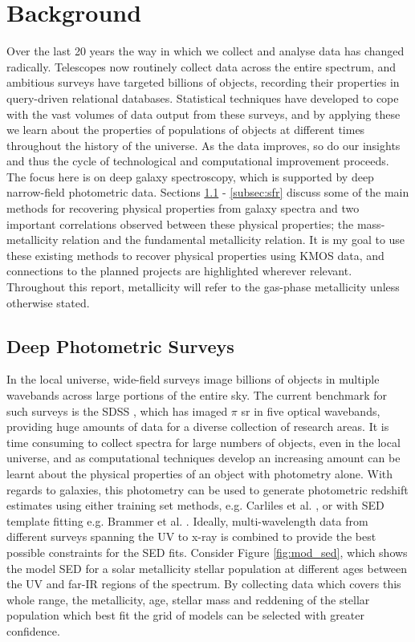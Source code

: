 \documentclass{literature}
\begin{document}
\section{Background}\label{sec:background}
Over the last 20 years the way in which we collect and analyse data has changed radically. Telescopes now routinely collect data across the entire spectrum, and ambitious surveys have targeted billions of objects, recording their properties in query-driven relational databases. Statistical techniques have developed to cope with the vast volumes of data output from these surveys, and by applying these we learn about the properties of populations of objects at different times throughout the history of the universe. As the data improves, so do our insights and thus the cycle of technological and computational improvement proceeds. \\

The focus here is on deep galaxy spectroscopy, which is supported by deep narrow-field photometric data. Sections \ref{subsec:deep_photometry} - \ref{subsec:sfr} discuss some of the main methods for recovering physical properties from galaxy spectra and two important correlations observed between these physical properties; the mass-metallicity relation and the fundamental metallicity relation. It is my goal to use these existing methods to recover physical properties using KMOS data, and connections to the planned projects are highlighted wherever relevant. Throughout this report, metallicity will refer to the gas-phase metallicity unless otherwise stated.  


\subsection{Deep Photometric Surveys}\label{subsec:deep_photometry}
In the local universe, wide-field surveys image billions of objects in multiple wavebands across large portions of the entire sky. The current benchmark for such surveys is the SDSS \citep{York2000}, which has imaged $\pi$ sr in five optical wavebands, providing huge amounts of data for a diverse collection of research areas. It is time consuming to collect spectra for large numbers of objects, even in the local universe, and as computational techniques develop an increasing amount can be learnt about the physical properties of an object with photometry alone. With regards to galaxies, this photometry can be used to generate photometric redshift estimates using either training set methods, e.g. Carliles et al. \citep{Carliles2010}, or with SED template fitting e.g. Brammer et al. \citep{Brammer2008}. Ideally, multi-wavelength data from different surveys spanning the UV to x-ray is combined to provide the best possible constraints for the SED fits. Consider Figure \ref{fig:mod_sed}, which shows the model SED for a solar metallicity stellar population at different ages between the UV and far-IR regions of the spectrum. By collecting data which covers this whole range, the metallicity, age, stellar mass and reddening of the stellar population which best fit the grid of models can be selected with greater confidence. \\
\end{document}
